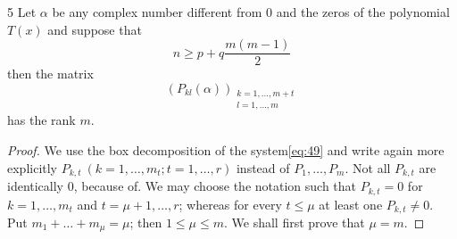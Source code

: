 \begin{mylemma}{}{5}
Let $\alpha$ be any complex number different from 0 and the zeros of the polynomial $T(x)$ and suppose that
\begin{equation}
n \ge p + q \frac{m(m-1)}{2} \tag{71}\label{eq:71}
\end{equation}
then the matrix
\begin{equation}
\left( P_{kl}(\alpha) \right)_{\substack{k = 1, \dots, m + t \\ l = 1, \dots, m}} \tag{72}\label{eq:72}
\end{equation}
has the rank $m$.
\end{mylemma}

\begin{proof}
We use the box decomposition of the system\eqref{eq:49} and write again more explicitly $P_{k,t} \ (k=1, \dots, m_t; t= 1, \dots, r)$ instead of $P_1, \dots, P_m$. Not all $P_{k,t}$ are identically 0, because of. We may choose the notation such that $P_{k,t} = 0$ for $k=1, \dots, m_t$ and $t=\mu+1, \dots, r$; whereas for every $t \le \mu$ at least one $P_{k,t} \neq 0$. Put $m_1 + \dots + m_\mu = \mu$; then $1 \le \mu \le m$. We shall first prove that $\mu = m$.


\end{proof}
